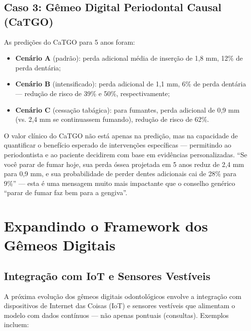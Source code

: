 \subsection{Caso 3: Gêmeo Digital Periodontal Causal (CaTGO)}


As predições do CaTGO para 5 anos foram:
\begin{itemize}
    \item \textbf{Cenário A} (padrão): perda adicional média de inserção de 1,8 mm, 12\% de perda dentária;
    \item \textbf{Cenário B} (intensificado): perda adicional de 1,1 mm, 6\% de perda dentária --- redução de risco de 39\% e 50\%, respectivamente;
    \item \textbf{Cenário C} (cessação tabágica): para fumantes, perda adicional de 0,9 mm (vs. 2,4 mm se continuassem fumando), redução de risco de 62\%.
\end{itemize}

O valor clínico do CaTGO não está apenas na predição, mas na capacidade de quantificar o benefício esperado de intervenções específicas --- permitindo ao periodontista e ao paciente decidirem com base em evidências personalizadas. ``Se você parar de fumar hoje, sua perda óssea projetada em 5 anos reduz de 2,4 mm para 0,9 mm, e sua probabilidade de perder dentes adicionais cai de 28\% para 9\%'' --- esta é uma mensagem muito mais impactante que o conselho genérico ``parar de fumar faz bem para a gengiva''.

\section{Expandindo o Framework dos Gêmeos Digitais}

\subsection{Integração com IoT e Sensores Vestíveis}

A próxima evolução dos gêmeos digitais odontológicos envolve a integração com dispositivos de Internet das Coisas (IoT) e sensores vestíveis que alimentam o modelo com dados contínuos --- não apenas pontuais (consultas). Exemplos incluem:

